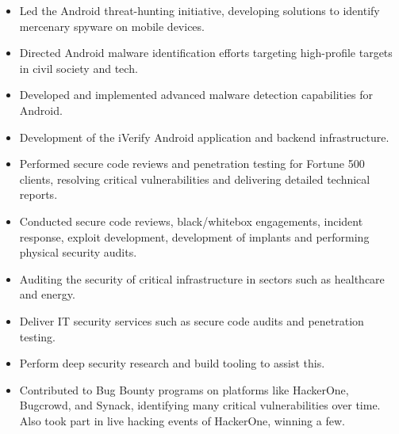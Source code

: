 \documentclass[10pt,a4paper,ragged2e,withhyper]{altacv}
\begin{document}
\begin{paracol}{2}

\begin{itemize}
\item Led the Android threat-hunting initiative, developing solutions to identify mercenary spyware on mobile devices.
\item Directed Android malware identification efforts targeting high-profile targets in civil society and tech.
\item Developed and implemented advanced malware detection capabilities for Android.
\item Development of the iVerify Android application and backend infrastructure.
\end{itemize}

\divider
\vspace{0.5em}

\begin{itemize}
\item Performed secure code reviews and penetration testing for Fortune 500 clients, resolving critical vulnerabilities and delivering detailed technical reports.
\end{itemize}

\divider
\vspace{0.5em}

\begin{itemize}
\item Conducted secure code reviews, black/whitebox engagements, incident response, exploit development, development of implants and performing physical security audits.
\item Auditing the security of critical infrastructure in sectors such as healthcare and energy.
\end{itemize}

\divider
\vspace{0.5em}

\begin{itemize}
\item Deliver IT security services such as secure code audits and penetration testing.
\item Perform deep security research and build tooling to assist this.
\item Contributed to Bug Bounty programs on platforms like HackerOne, Bugcrowd, and Synack, identifying many critical vulnerabilities over time. Also took part in live hacking events of HackerOne, winning a few.
\end{itemize}


\end{paracol}
\end{document}
